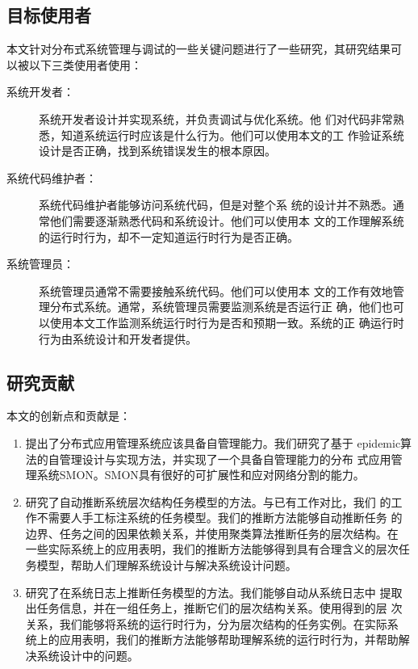 \subsection{目标使用者}

本文针对分布式系统管理与调试的一些关键问题进行了一些研究，其研究结果可
以被以下三类使用者使用：

\begin{description}

  \item[系统开发者：] 系统开发者设计并实现系统，并负责调试与优化系统。他
  们对代码非常熟悉，知道系统运行时应该是什么行为。他们可以使用本文的工
  作验证系统设计是否正确，找到系统错误发生的根本原因。

  \item[系统代码维护者：] 系统代码维护者能够访问系统代码，但是对整个系
  统的设计并不熟悉。通常他们需要逐渐熟悉代码和系统设计。他们可以使用本
  文的工作理解系统的运行时行为，却不一定知道运行时行为是否正确。

  \item[系统管理员：] 系统管理员通常不需要接触系统代码。他们可以使用本
  文的工作有效地管理分布式系统。通常，系统管理员需要监测系统是否运行正
  确，他们也可以使用本文工作监测系统运行时行为是否和预期一致。系统的正
  确运行时行为由系统设计和开发者提供。

\end{description}

\subsection{研究贡献}

本文的创新点和贡献是：

\begin{enumerate}

  \item 提出了分布式应用管理系统应该具备自管理能力。我们研究了基于
  epidemic算法的自管理设计与实现方法，并实现了一个具备自管理能力的分布
  式应用管理系统SMON。SMON具有很好的可扩展性和应对网络分割的能力。

  \item 研究了自动推断系统层次结构任务模型的方法。与已有工作对比，我们
  的工作不需要人手工标注系统的任务模型。我们的推断方法能够自动推断任务
  的边界、任务之间的因果依赖关系，并使用聚类算法推断任务的层次结构。在
  一些实际系统上的应用表明，我们的推断方法能够得到具有合理含义的层次任
  务模型，帮助人们理解系统设计与解决系统设计问题。

  \item 研究了在系统日志上推断任务模型的方法。我们能够自动从系统日志中
  提取出任务信息，并在一组任务上，推断它们的层次结构关系。使用得到的层
  次关系，我们能够将系统的运行时行为，分为层次结构的任务实例。在实际系
  统上的应用表明，我们的推断方法能够帮助理解系统的运行时行为，并帮助解
  决系统设计中的问题。

\end{enumerate}

